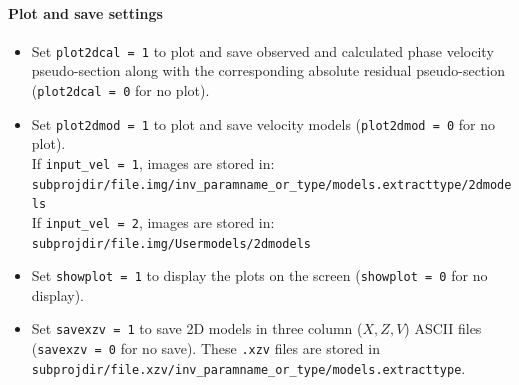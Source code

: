 \documentclass[twoside,a4paper]{article}
\begin{document}
\paragraph{Plot and save settings}
\begin{itemize}[leftmargin=*]
\setlength\itemsep{2ex}
\item Set \verb|plot2dcal = 1| to plot and save observed and calculated phase velocity pseudo-section along with the corresponding absolute residual pseudo-section (\verb|plot2dcal = 0| for no plot).

\item Set \verb|plot2dmod = 1| to plot and save velocity models (\verb|plot2dmod = 0| for no plot).\\[1ex]
If \verb|input_vel = 1|, images are stored in:\\
\verb|subprojdir/file.img/inv_paramname_or_type/models.extracttype/2dmodels|\\[1ex]
If \verb|input_vel = 2|, images are stored in:\\
\verb|subprojdir/file.img/Usermodels/2dmodels|

\item Set \verb|showplot = 1| to display the plots on the screen (\verb|showplot = 0| for no display).

\item Set \verb|savexzv = 1| to save 2D models in three column ($X,Z,V$) ASCII files (\verb|savexzv = 0| for no save). These \verb|.xzv| files are stored in \verb|subprojdir/file.xzv/inv_paramname_or_type/models.extracttype|.
\end{itemize}
\end{document}
